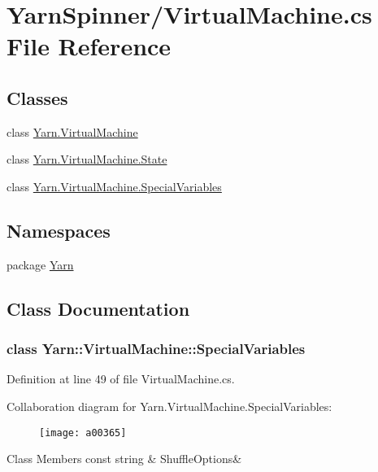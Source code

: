 \hypertarget{a00291}{\section{Yarn\-Spinner/\-Virtual\-Machine.cs File Reference}
\label{a00291}
}
\subsection*{Classes}
\begin{DoxyCompactItemize}
\item 
class \hyperlink{a00145}{Yarn.\-Virtual\-Machine}
\item 
class \hyperlink{a00148}{Yarn.\-Virtual\-Machine.\-State}
\item 
class \hyperlink{a00145_a00353}{Yarn.\-Virtual\-Machine.\-Special\-Variables}
\end{DoxyCompactItemize}
\subsection*{Namespaces}
\begin{DoxyCompactItemize}
\item 
package \hyperlink{a00048}{Yarn}
\end{DoxyCompactItemize}


\subsection{Class Documentation}
\label{a00353}
\hypertarget{a00145_a00353}{}
\subsubsection{class Yarn\-:\-:Virtual\-Machine\-:\-:Special\-Variables}


Definition at line 49 of file Virtual\-Machine.\-cs.



Collaboration diagram for Yarn.\-Virtual\-Machine.\-Special\-Variables\-:
\nopagebreak
\begin{figure}[H]
\begin{center}
\leavevmode
\texttt{[image: a00365]}
\end{center}
\end{figure}
\begin{DoxyFields}{Class Members}
\hypertarget{a00145_aecbb8ab9becd96457d836100b2818078}{const string}\label{a00145_aecbb8ab9becd96457d836100b2818078}
&
Shuffle\-Options&
\\
\hline

\end{DoxyFields}
